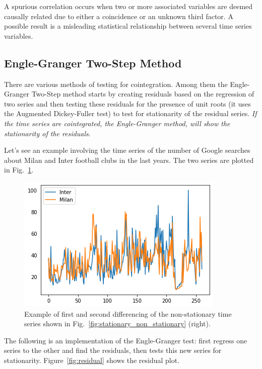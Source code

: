 A spurious correlation occurs when two or more associated variables are
deemed causally related due to either a coincidence or an unknown third
factor. A possible result is a misleading statistical relationship
between several time series variables.

\subsection{Engle-Granger Two-Step Method}
\label{engle-granger-two-step-method}

There are various methods of testing for cointegration. Among them the
Engle-Granger Two-Step method starts by creating residuals based on the
regression of two series and then testing these residuals for
the presence of unit roots (it uses the Augmented Dickey-Fuller test) 
to test for stationarity of the residual series. \emph{If the time
series are cointegrated, the Engle-Granger method, will show the
stationarity of the residuals}.

Let's see an example involving the time series of the number of Google
searches about Milan and Inter football clubs in the last years.
The two series are plotted in Fig.~\ref{fig:cointegrated_series}.

\begin{figure}[htb]
	\centering
	\includegraphics[width=0.7\linewidth]{figures/cointegrated_series.png}
	\caption{Example of first and second differencing of the non-stationary time series shown in Fig.~\ref{fig:stationary_non_stationary} (right).}
	\label{fig:cointegrated_series}
\end{figure}

The following is an implementation of the Engle-Granger test: first regress
one series to the other and find the residuals, then tests this new series
for stationarity. Figure~\ref{fig:residual} shows the residual plot.
   
